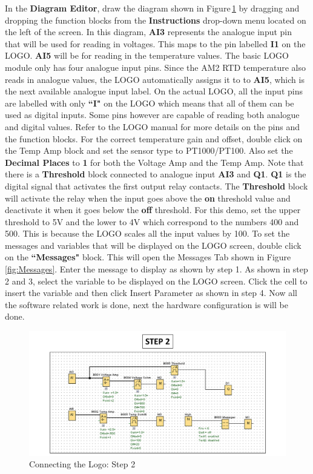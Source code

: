 \documentclass[11pt]{IEEEtran}
\begin{document}
\noindent In the \textbf{Diagram Editor}, draw the diagram shown in Figure\,\ref{fig:diagram} by dragging and dropping the function blocks from the \textbf{Instructions} drop-down menu located on the left of the screen. In this diagram, \textbf{AI3} represents the analogue input pin that will be used for reading in voltages. This maps to the pin labelled \textbf{I1} on the LOGO. \textbf{AI5} will be for reading in the temperature values. The basic LOGO module only has four analogue input pins. Since the AM2 RTD temperature also reads in analogue values, the LOGO automatically assigns it to to \textbf{AI5}, which is the next available analogue input label. On the actual LOGO, all the input pins are labelled with only \textbf{``I"} on the LOGO which means that all of them can be used as digital inputs. Some pins however are capable of reading both analogue and digital values. Refer to the LOGO manual for more details on the pins and the function blocks. For the correct temperature gain and offset, double click on the Temp Amp block and set the sensor type to PT1000/PT100. Also set the \textbf{Decimal Places} to \textbf{1} for both the Voltage Amp and the Temp Amp. Note that there is a \textbf{Threshold} block connected to analogue input \textbf{AI3} and \textbf{Q1}. \textbf{Q1} is the digital signal that activates the first output relay contacts. The \textbf{Threshold} block will activate the relay when the input goes above the \textbf{on} threshold value and deactivate it when it goes below the \textbf{off} threshold. For this demo, set the upper threshold to 5V and the lower to 4V which correspond to the numbers 400 and 500. This is because the LOGO scales all the input values by 100. To set the messages and variables that will be displayed on the LOGO screen, double click on the \textbf{``Messages"} block. This will open the Messages Tab shown in Figure\,\ref{fig:Messages}. Enter the message to display as shown by step 1. As shown in step 2 and 3, select the variable to be displayed on the LOGO screen. Click the cell to insert the variable and then click Insert Parameter as shown in step 4. Now all the software related work is done, next the hardware configuration is will be done. 

\begin{figure}[H]
	\centering
	\includegraphics[scale=0.75]{Step2.pdf}
	\caption{Connecting the Logo: Step 2}
	\label{fig:diagram}
\end{figure}
\end{document}

